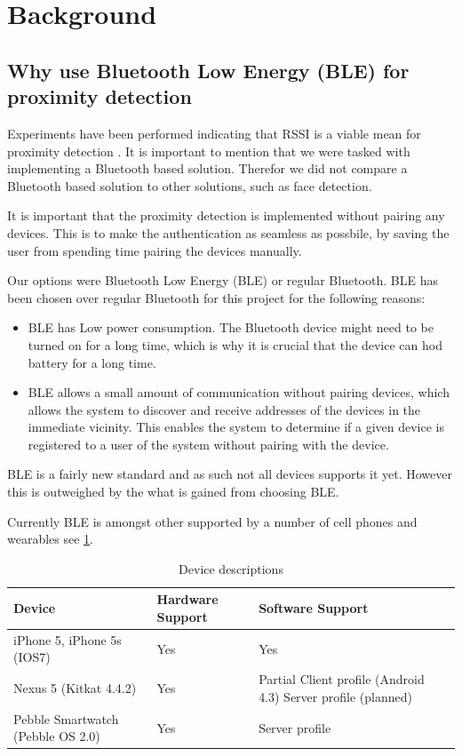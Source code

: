 \section{Background}

\subsection{Why use Bluetooth Low Energy (BLE) for proximity detection}


Experiments have been performed indicating that RSSI is a viable mean for proximity detection \cite{ref:Takashi}.  It is important to mention that we were tasked with implementing a Bluetooth based solution. Therefor we did not compare a Bluetooth based solution to other solutions, such as face detection.

It is important that the proximity detection is implemented without pairing any devices. This is to make the authentication as seamless as possbile, by saving the user from spending time pairing the devices manually.

Our options were Bluetooth Low Energy (BLE) or regular Bluetooth. BLE has been chosen over regular Bluetooth for this project for the following reasons:
\begin{itemize}
	\item BLE has Low power consumption. The Bluetooth device might need to be turned on for a long time, which is why it is crucial that the device can hod battery for a long time.
	\item BLE allows a small amount of communication without pairing devices, which allows the system to discover and receive addresses of the devices in the immediate vicinity. This enables the system to determine if a given device is registered to a user of the system without pairing with the device.
\end{itemize}

BLE is a fairly new standard and as such not all devices supports it yet. However this is outweighed by the what is gained from choosing BLE. 

Currently BLE is amongst other supported by a number of cell phones and wearables see \cref{table:devices}.

\begin{table}[!t]
\caption{Device descriptions}
\label{table:devices}
\centering
\begin{tabular}{|p{2.3cm}|p{1.3cm}|p{3.8cm}|}
\hline
\textbf{Device} & \textbf{Hardware Support} & \textbf{Software Support}\\
\hline
iPhone 5, iPhone 5s (IOS7) & Yes & Yes\\
\hline
Nexus 5 \newline (Kitkat 4.4.2) & Yes & Partial \newline
Client profile (Android 4.3)
Server profile (planned)\\
\hline
Pebble Smartwatch (Pebble OS 2.0) & Yes & Server profile\\
\hline
\end{tabular}
\end{table}

